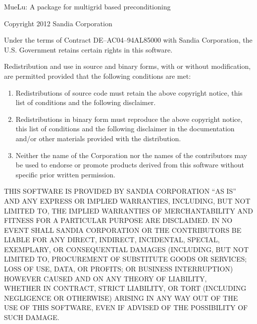 \label{sec:license}
\begin{center}
MueLu: A package for multigrid based preconditioning

Copyright 2012 Sandia Corporation
\end{center}

\noindent
Under the terms of Contract DE--AC04--94AL85000 with Sandia Corporation,
the U.S. Government retains certain rights in this software.

\noindent
Redistribution and use in source and binary forms, with or without
modification, are permitted provided that the following conditions are
met:

\begin{enumerate}
  \item Redistributions of source code must retain the above copyright
    notice, this list of conditions and the following disclaimer.

\item Redistributions in binary form must reproduce the above copyright
  notice, this list of conditions and the following disclaimer in the
  documentation and/or other materials provided with the distribution.

\item Neither the name of the Corporation nor the names of the
  contributors may be used to endorse or promote products derived from
  this software without specific prior written permission.
\end{enumerate}

\noindent
THIS SOFTWARE IS PROVIDED BY SANDIA CORPORATION ``AS IS'' AND ANY
EXPRESS OR IMPLIED WARRANTIES, INCLUDING, BUT NOT LIMITED TO, THE
IMPLIED WARRANTIES OF MERCHANTABILITY AND FITNESS FOR A PARTICULAR
PURPOSE ARE DISCLAIMED\@. IN NO EVENT SHALL SANDIA CORPORATION OR THE
CONTRIBUTORS BE LIABLE FOR ANY DIRECT, INDIRECT, INCIDENTAL, SPECIAL,
EXEMPLARY, OR CONSEQUENTIAL DAMAGES (INCLUDING, BUT NOT LIMITED TO,
PROCUREMENT OF SUBSTITUTE GOODS OR SERVICES\@; LOSS OF USE, DATA, OR
PROFITS\@; OR BUSINESS INTERRUPTION) HOWEVER CAUSED AND ON ANY THEORY OF
LIABILITY, \\WHETHER IN CONTRACT, STRICT LIABILITY, OR TORT (INCLUDING
NEGLIGENCE OR OTHERWISE) ARISING IN ANY WAY OUT OF THE USE OF THIS
SOFTWARE, EVEN IF ADVISED OF THE POSSIBILITY OF SUCH DAMAGE\@.


